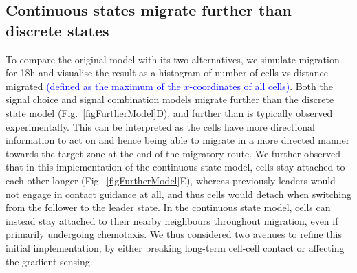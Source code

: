\documentclass[review]{elsarticle}
\newcommand\hl[1]{{\textcolor{blue}{#1}}}
\begin{document}
\subsection{Continuous states migrate further than discrete states}
To compare the original model with its two alternatives, we simulate migration for 18h and visualise the result as a histogram of number of cells vs distance migrated \hl{(defined as the maximum of the $x$-coordinates of all cells)}. Both the signal choice and signal combination models migrate further than the discrete state model (Fig.~\ref{figFurtherModel}D), and further than is typically observed experimentally. This can be interpreted as the cells have more directional information to act on and hence being able to migrate in a more directed manner towards the target zone at the end of the migratory route. We further observed that in this implementation of the continuous state model, cells stay attached to each other longer (Fig.~\ref{figFurtherModel}E), whereas previously leaders would not engage in contact guidance at all, and thus cells would detach when switching from the follower to the leader state. In the continuous state model, cells can instead stay attached to their nearby neighbours throughout migration, even if primarily undergoing chemotaxis. We thus considered two avenues to refine this initial implementation, by either breaking long-term cell-cell contact or affecting the gradient sensing. %
\end{document}
